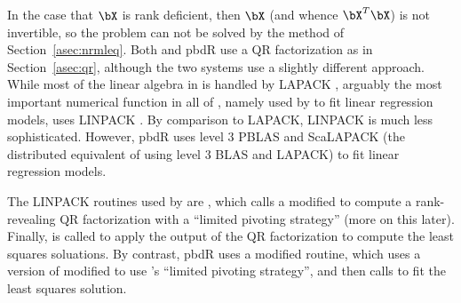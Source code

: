In the case that $\bX$ is rank deficient, then $\bX$ (and whence $\bX^T\bX$) is not invertible, so the problem can not be solved by the method of Section~\ref{asec:nrmleq}.  Both  and pbdR use a QR factorization as in Section~\ref{asec:qr}, although the two systems use a slightly different approach.  While most of the linear algebra in  is handled by LAPACK \citep{lug}, arguably the most important numerical function in all of , namely  used by  to fit linear regression models, uses LINPACK \citep{linpack}.  By comparison to LAPACK, LINPACK is much less sophisticated.  However, pbdR uses level 3 PBLAS and ScaLAPACK (the distributed equivalent of using level 3 BLAS and LAPACK) to fit linear regression models.

The LINPACK routines used by  are , which calls a modified  to compute a rank-revealing QR factorization with a ``limited pivoting strategy'' (more on this later).  Finally,  is called to apply the output of the QR factorization to compute the least squares soluations.  By contrast, pbdR uses a modified  routine, which uses a version of  modified to use 's ``limited pivoting strategy'', and then calls  to fit the least squares solution.

